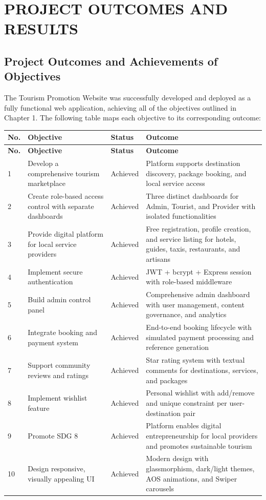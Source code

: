 \chapter{PROJECT OUTCOMES AND RESULTS}

\section{Project Outcomes and Achievements of Objectives}

The Tourism Promotion Website was successfully developed and deployed as a fully functional web application, achieving all of the objectives outlined in Chapter 1. The following table maps each objective to its corresponding outcome:

\begin{longtable}{|p{0.5cm}|p{5.5cm}|p{3cm}|p{3.5cm}|}
\hline
\textbf{No.} & \textbf{Objective} & \textbf{Status} & \textbf{Outcome} \\
\hline
\endfirsthead
\hline
\textbf{No.} & \textbf{Objective} & \textbf{Status} & \textbf{Outcome} \\
\hline
\endhead
1 & Develop a comprehensive tourism marketplace & Achieved & Platform supports destination discovery, package booking, and local service access \\
\hline
2 & Create role-based access control with separate dashboards & Achieved & Three distinct dashboards for Admin, Tourist, and Provider with isolated functionalities \\
\hline
3 & Provide digital platform for local service providers & Achieved & Free registration, profile creation, and service listing for hotels, guides, taxis, restaurants, and artisans \\
\hline
4 & Implement secure authentication & Achieved & JWT + bcrypt + Express session with role-based middleware \\
\hline
5 & Build admin control panel & Achieved & Comprehensive admin dashboard with user management, content governance, and analytics \\
\hline
6 & Integrate booking and payment system & Achieved & End-to-end booking lifecycle with simulated payment processing and reference generation \\
\hline
7 & Support community reviews and ratings & Achieved & Star rating system with textual comments for destinations, services, and packages \\
\hline
8 & Implement wishlist feature & Achieved & Personal wishlist with add/remove and unique constraint per user-destination pair \\
\hline
9 & Promote SDG 8 & Achieved & Platform enables digital entrepreneurship for local providers and promotes sustainable tourism \\
\hline
10 & Design responsive, visually appealing UI & Achieved & Modern design with glassmorphism, dark/light themes, AOS animations, and Swiper carousels \\
\hline
\end{longtable}

